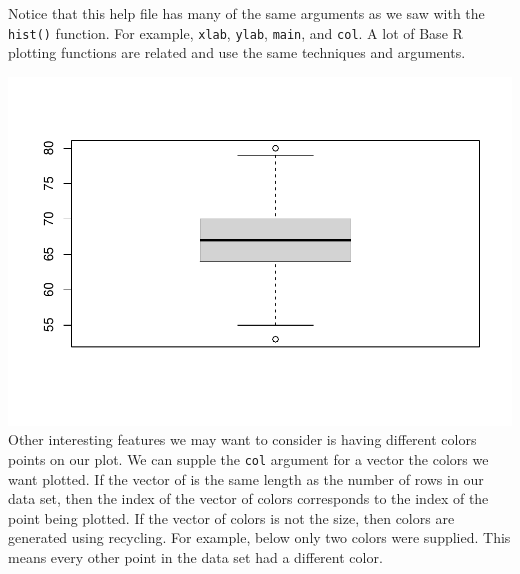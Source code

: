 \documentclass[
]{book}
\newenvironment{Shaded}{\begin{snugshade}}{\end{snugshade}}
\newcommand{\CommentTok}[1]{\textcolor[rgb]{0.56,0.35,0.01}{\textit{#1}}}
\newcommand{\DataTypeTok}[1]{\textcolor[rgb]{0.13,0.29,0.53}{#1}}
\newcommand{\KeywordTok}[1]{\textcolor[rgb]{0.13,0.29,0.53}{\textbf{#1}}}
\newcommand{\NormalTok}[1]{#1}
\newcommand{\OperatorTok}[1]{\textcolor[rgb]{0.81,0.36,0.00}{\textbf{#1}}}
\newcommand{\StringTok}[1]{\textcolor[rgb]{0.31,0.60,0.02}{#1}}
\begin{document}
Notice that this help file has many of the same arguments as we saw with the \texttt{hist()} function. For example, \texttt{xlab}, \texttt{ylab}, \texttt{main}, and \texttt{col}. A lot of Base R plotting functions are related and use the same techniques and arguments.

\begin{Shaded}
\end{Shaded}

\includegraphics{_main_files/figure-latex/unnamed-chunk-177-1.pdf}
Other interesting features we may want to consider is having different colors points on our plot. We can supple the \texttt{col} argument for a vector the colors we want plotted. If the vector of is the same length as the number of rows in our data set, then the index of the vector of colors corresponds to the index of the point being plotted. If the vector of colors is not the size, then colors are generated using recycling. For example, below only two colors were supplied. This means every other point in the data set had a different color.

\begin{Shaded}
\end{Shaded}
\end{document}
